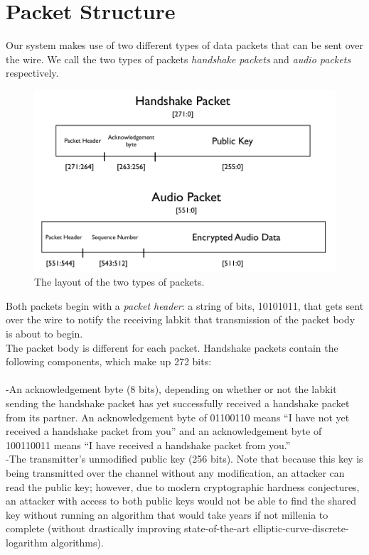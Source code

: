 \documentclass[a4paper]{report}
\begin{document}
\section{Packet Structure}

Our system makes use of two different types of data packets that can be sent over the wire. We call the two types of packets \emph{handshake packets} and \emph{audio packets} respectively.  \\

\begin{figure}
\label{fig1}
\includegraphics[width=\textwidth]{figs/packets.png}
\centering \caption{The layout of the two types of packets.} 
\end{figure}

Both packets begin with a \emph{packet header}: a string of bits, 10101011, that gets sent over the wire to notify the receiving labkit that transmission of the packet body is about to begin.  \\

The packet body is different for each packet. Handshake packets contain the following components, which make up 272 bits: \\ \\
-An acknowledgement byte (8 bits), depending on whether or not the labkit sending the handshake packet has yet successfully received a handshake packet from its partner. An acknowledgement byte of 01100110 means ``I have not yet received a handshake packet from you'' and an acknowledgement byte of 100110011 means ``I have received a handshake packet from you.''  \\
-The transmitter's unmodified public key (256 bits). Note that because this key is being transmitted over the channel without any modification, an attacker can read the public key; however, due to modern cryptographic hardness conjectures, an attacker with access to both public keys would not be able to find the shared key without running an algorithm that would take years if not millenia to complete (without drastically improving state-of-the-art elliptic-curve-discrete-logarithm algorithms). \\
\end{document}
